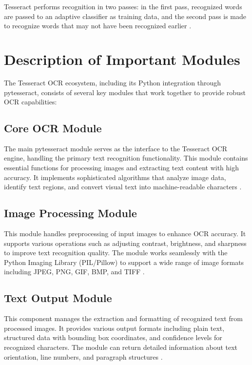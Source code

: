 \documentclass{article}
\begin{document}
	Tesseract performs recognition in two passes: in the first pass, recognized words are passed to an adaptive classifier as training data, and the second pass is made to recognize words that may not have been recognized earlier \cite {Joshi:2021}.
	
	\section{Description of Important Modules}
	
	The Tesseract OCR ecosystem, including its Python integration through pytesseract, consists of several key modules that work together to provide robust OCR capabilities:
	
	\subsection{Core OCR Module}
	The main pytesseract module serves as the interface to the Tesseract OCR engine, handling the primary text recognition functionality. This module contains essential functions for processing images and extracting text content with high accuracy. It implements sophisticated algorithms that analyze image data, identify text regions, and convert visual text into machine-readable characters \cite {DataCamp:2024, Betterpath:2023}.
	
	\subsection{Image Processing Module}
	This module handles preprocessing of input images to enhance OCR accuracy. It supports various operations such as adjusting contrast, brightness, and sharpness to improve text recognition quality. The module works seamlessly with the Python Imaging Library (PIL/Pillow) to support a wide range of image formats including JPEG, PNG, GIF, BMP, and TIFF \cite {Betterpath:2023, GeekyAnts:2023}.
	
	\subsection{Text Output Module}
	This component manages the extraction and formatting of recognized text from processed images. It provides various output formats including plain text, structured data with bounding box coordinates, and confidence levels for recognized characters. The module can return detailed information about text orientation, line numbers, and paragraph structures \cite {Betterpath:2023, DataCamp:2024}.
	
\end{document}
